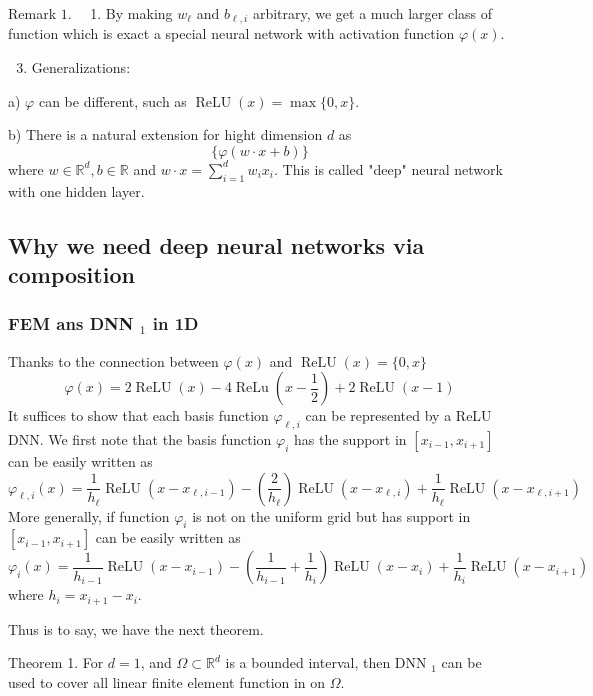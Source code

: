 \documentclass[10pt]{article}
\begin{document}
Remark $1 . \quad$ 1. By making $w_{\ell}$ and $b_{\ell, i}$ arbitrary, we get a much larger class of function which is exact a special neural network with activation function $\varphi(x)$.

  \begin{enumerate}
    \setcounter{enumii}{2}
    \item Generalizations:
  \end{enumerate}
a) $\varphi$ can be different, such as $\operatorname{ReLU}(x)=\max \{0, x\}$.

b) There is a natural extension for hight dimension $d$ as
$$
\{\varphi(w \cdot x+b)\}
$$
where $w \in \mathbb{R}^{d}, b \in \mathbb{R}$ and $w \cdot x=\sum_{i=1}^{d} w_{i} x_{i}$. This is called "deep" neural network with one hidden layer.

\subsection{Why we need deep neural networks via composition}
\subsubsection{FEM ans DNN $_{1}$ in 1D}
Thanks to the connection between $\varphi(x)$ and $\operatorname{ReLU}(x)=\{0, x\}$
$$
\varphi(x)=2 \operatorname{ReLU}(x)-4 \operatorname{ReLu}\left(x-\frac{1}{2}\right)+2 \operatorname{ReLU}(x-1)
$$
It suffices to show that each basis function $\varphi_{\ell, i}$ can be represented by a ReLU DNN. We first note that the basis function $\varphi_{i}$ has the support in $\left[x_{i-1}, x_{i+1}\right]$ can be easily written as
$$
\varphi_{\ell, i}(x)=\frac{1}{h_{\ell}} \operatorname{ReLU}\left(x-x_{\ell, i-1}\right)-\left(\frac{2}{h_{\ell}}\right) \operatorname{ReLU}\left(x-x_{\ell, i}\right)+\frac{1}{h_{\ell}} \operatorname{ReLU}\left(x-x_{\ell, i+1}\right)
$$
More generally, if function $\varphi_{i}$ is not on the uniform grid but has support in $\left[x_{i-1}, x_{i+1}\right]$ can be easily written as
$$
\varphi_{i}(x)=\frac{1}{h_{i-1}} \operatorname{ReLU}\left(x-x_{i-1}\right)-\left(\frac{1}{h_{i-1}}+\frac{1}{h_{i}}\right) \operatorname{ReLU}\left(x-x_{i}\right)+\frac{1}{h_{i}} \operatorname{ReLU}\left(x-x_{i+1}\right)
$$
where $h_{i}=x_{i+1}-x_{i}$.

Thus is to say, we have the next theorem.

Theorem 1. For $d=1$, and $\Omega \subset \mathbb{R}^{d}$ is a bounded interval, then DNN $_{1}$ can be used to cover all linear finite element function in on $\Omega$.
\end{document}
